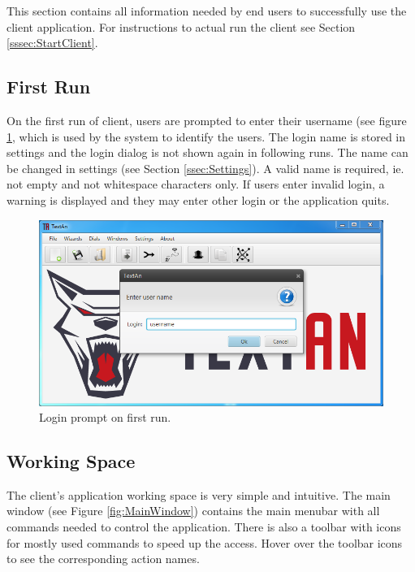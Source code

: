 This section contains all information needed by end users to successfully use
the \textan{} client application. For instructions to actual run the client
see Section \ref{sssec:StartClient}. 

\subsection{First Run}

On the first run of \textan{} client, users are prompted to enter their username
(see figure \ref{fig:Login}, which is used by the system to identify the users.
The login name is stored in settings and the login dialog is not shown again
in following runs. The name can be changed in settings (see Section
\ref{ssec:Settings}). A valid name is required, ie. not empty and not whitespace
characters only. If users enter invalid login, a warning is displayed and they
may enter other login or the application quits.

\begin{figure}[!htb]
        \centering
        \includegraphics[width=\textwidth]{Images/login}
        \caption{Login prompt on first run.}
        \label{fig:Login}
\end{figure}

\subsection{Working Space}

The \textan{} client's application working space is very simple and intuitive.
The main window (see Figure \ref{fig:MainWindow}) contains the main menubar with
all commands needed to control the application. There is also a toolbar with
icons for mostly used commands to speed up the access. Hover over the
toolbar icons to see the corresponding action names.

